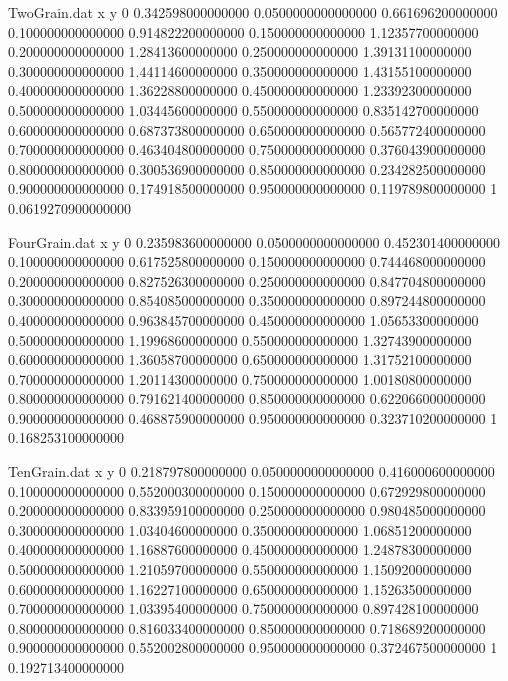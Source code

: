 \begin{filecontents}{TwoGrain.dat}
x y
0	0.342598000000000
0.0500000000000000	0.661696200000000
0.100000000000000	0.914822200000000
0.150000000000000	1.12357700000000
0.200000000000000	1.28413600000000
0.250000000000000	1.39131100000000
0.300000000000000	1.44114600000000
0.350000000000000	1.43155100000000
0.400000000000000	1.36228800000000
0.450000000000000	1.23392300000000
0.500000000000000	1.03445600000000
0.550000000000000	0.835142700000000
0.600000000000000	0.687373800000000
0.650000000000000	0.565772400000000
0.700000000000000	0.463404800000000
0.750000000000000	0.376043900000000
0.800000000000000	0.300536900000000
0.850000000000000	0.234282500000000
0.900000000000000	0.174918500000000
0.950000000000000	0.119789800000000
1	0.0619270900000000
\end{filecontents}

\begin{filecontents}{FourGrain.dat}
x y
0	0.235983600000000
0.0500000000000000	0.452301400000000
0.100000000000000	0.617525800000000
0.150000000000000	0.744468000000000
0.200000000000000	0.827526300000000
0.250000000000000	0.847704800000000
0.300000000000000	0.854085000000000
0.350000000000000	0.897244800000000
0.400000000000000	0.963845700000000
0.450000000000000	1.05653300000000
0.500000000000000	1.19968600000000
0.550000000000000	1.32743900000000
0.600000000000000	1.36058700000000
0.650000000000000	1.31752100000000
0.700000000000000	1.20114300000000
0.750000000000000	1.00180800000000
0.800000000000000	0.791621400000000
0.850000000000000	0.622066000000000
0.900000000000000	0.468875900000000
0.950000000000000	0.323710200000000
1	0.168253100000000
\end{filecontents}

\begin{filecontents}{TenGrain.dat}
x y
0	0.218797800000000
0.0500000000000000	0.416000600000000
0.100000000000000	0.552000300000000
0.150000000000000	0.672929800000000
0.200000000000000	0.833959100000000
0.250000000000000	0.980485000000000
0.300000000000000	1.03404600000000
0.350000000000000	1.06851200000000
0.400000000000000	1.16887600000000
0.450000000000000	1.24878300000000
0.500000000000000	1.21059700000000
0.550000000000000	1.15092000000000
0.600000000000000	1.16227100000000
0.650000000000000	1.15263500000000
0.700000000000000	1.03395400000000
0.750000000000000	0.897428100000000
0.800000000000000	0.816033400000000
0.850000000000000	0.718689200000000
0.900000000000000	0.552002800000000
0.950000000000000	0.372467500000000
1	0.192713400000000
\end{filecontents}

